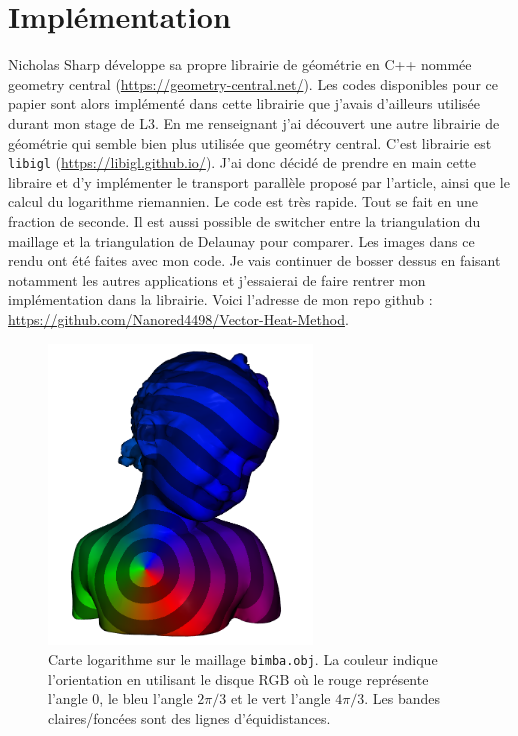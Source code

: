 \documentclass[11pt]{article}
\begin{document}
	\section{Implémentation}
	
	Nicholas Sharp développe sa propre librairie de géométrie en C++ nommée geometry central (\url{https://geometry-central.net/}). Les codes disponibles pour ce papier sont alors implémenté dans cette librairie que j'avais d'ailleurs utilisée durant mon stage de L3. En me renseignant j'ai découvert une autre librairie de géométrie qui semble bien plus utilisée que geométry central. C'est librairie est \verb|libigl| (\url{https://libigl.github.io/}). J'ai donc décidé de prendre en main cette libraire et d'y implémenter le transport parallèle proposé par l'article, ainsi que le calcul du logarithme riemannien. Le code est très rapide. Tout se fait en une fraction de seconde. Il est aussi possible de switcher entre la triangulation du maillage et la triangulation de Delaunay pour comparer. Les images dans ce rendu ont été faites avec mon code. Je vais continuer de bosser dessus en faisant notamment les autres applications et j'essaierai de faire rentrer mon implémentation dans la librairie. Voici l'adresse de mon repo github : \url{https://github.com/Nanored4498/Vector-Heat-Method}.
	
	\begin{figure}
		\centering
		\includegraphics[width=7cm]{bimba_log.png}
		\caption{Carte logarithme sur le maillage \texttt{bimba.obj}. La couleur indique l'orientation en utilisant le disque RGB où le rouge représente l'angle 0, le bleu l'angle $2\pi/3$ et le vert l'angle $4\pi/3$. Les bandes claires/foncées sont des lignes d'équidistances.}
		\label{fig:bimba}
	\end{figure}
\end{document}
